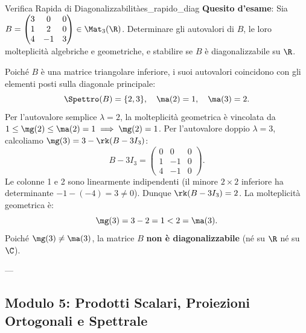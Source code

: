 \begin{esempio}{Verifica Rapida di Diagonalizzabilità}{es_rapido_diag}
\textbf{Quesito d'esame}: Sia $B = \begin{pmatrix} 3 & 0 & 0 \\ 1 & 2 & 0 \\ 4 & -1 & 3 \end{pmatrix} \in \Mat_3(\R)$.
Determinare gli autovalori di $B$, le loro molteplicità algebriche e geometriche, e stabilire se $B$ è diagonalizzabile su $\R$.

\begin{dimostrazione}[Risoluzione]
Poiché $B$ è una matrice triangolare inferiore, i suoi autovalori coincidono con gli elementi posti sulla diagonale principale:
\begin{equation}
    \Spettro(B) = \{2, 3\}, \quad \ma(2) = 1, \quad \ma(3) = 2.
\end{equation}
Per l'autovalore semplice $\lambda = 2$, la molteplicità geometrica è vincolata da $1 \le \mg(2) \le \ma(2) = 1 \implies \mg(2) = 1$.
Per l'autovalore doppio $\lambda = 3$, calcoliamo $\mg(3) = 3 - \rk(B - 3 I_3)$:
\begin{equation}
    B - 3 I_3 = \begin{pmatrix}
        0 & 0 & 0 \\
        1 & -1 & 0 \\
        4 & -1 & 0
    \end{pmatrix}.
\end{equation}
Le colonne 1 e 2 sono linearmente indipendenti (il minore $2 \times 2$ inferiore ha determinante $-1 - (-4) = 3 \neq 0$). Dunque $\rk(B - 3 I_3) = 2$.
La molteplicità geometrica è:
\begin{equation}
    \mg(3) = 3 - 2 = 1 < 2 = \ma(3).
\end{equation}
Poiché $\mg(3) \neq \ma(3)$, la matrice $B$ \textbf{non è diagonalizzabile} (né su $\R$ né su $\C$).
\end{dimostrazione}
\end{esempio}

---

\subsection{Modulo 5: Prodotti Scalari, Proiezioni Ortogonali e Spettrale}

